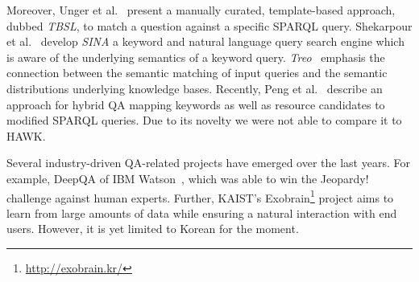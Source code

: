 Moreover, Unger et al.~\cite{tbsl} present a manually curated, template-based approach, dubbed \emph{TBSL}, to match a question against a specific SPARQL query. 
{Shekarpour et al.~\cite{SINA_WebSemantic}} develop \emph{SINA} a keyword and natural language query search engine which is aware of the underlying semantics of a keyword query. 
\emph{Treo}~\cite{treo} emphasis the connection between the semantic matching of input queries and the semantic distributions underlying knowledge bases.
Recently, Peng et al.~\cite{DBLP:journals/corr/PengZZ14} describe an approach for hybrid QA mapping keywords as well as resource candidates to modified SPARQL queries. Due to its novelty we were not able to compare it to HAWK.

Several industry-driven QA-related projects have emerged over the last years. 
For example, DeepQA of IBM Watson~\cite{watson}, which was able to win the Jeopardy! challenge against human experts. 
Further, {KAIST's Exobrain\footnote{\url{http://exobrain.kr/}}} project aims to learn from large amounts of data while ensuring a natural interaction with end users. 
However, it is yet limited to Korean for the moment. %

